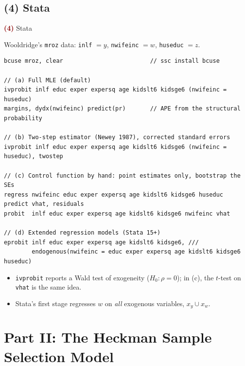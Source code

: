\documentclass[aspectratio=169,11pt]{beamer}
\newcommand{\Part}[1]{\textcolor{DarkRed}{\textbf{(#1)}}}
\begin{document}
\subsection{(4) Stata}

\begin{frame}[fragile]{\Part{4} Stata}

Wooldridge's \texttt{mroz} data: \texttt{inlf} $=y$, \texttt{nwifeinc} $=w$, \texttt{huseduc} $=z$.

\begin{lstlisting}[style=stata]
bcuse mroz, clear                         // ssc install bcuse

// (a) Full MLE (default)
ivprobit inlf educ exper expersq age kidslt6 kidsge6 (nwifeinc = huseduc)
margins, dydx(nwifeinc) predict(pr)       // APE from the structural probability

// (b) Two-step estimator (Newey 1987), corrected standard errors
ivprobit inlf educ exper expersq age kidslt6 kidsge6 (nwifeinc = huseduc), twostep

// (c) Control function by hand: point estimates only, bootstrap the SEs
regress nwifeinc educ exper expersq age kidslt6 kidsge6 huseduc
predict vhat, residuals
probit  inlf educ exper expersq age kidslt6 kidsge6 nwifeinc vhat

// (d) Extended regression models (Stata 15+)
eprobit inlf educ exper expersq age kidslt6 kidsge6, ///
        endogenous(nwifeinc = educ exper expersq age kidslt6 kidsge6 huseduc)
\end{lstlisting}

\vspace{-0.2em}
\footnotesize
\begin{itemize}
  \item \texttt{ivprobit} reports a Wald test of exogeneity ($H_0:\rho=0$);
        in (c), the $t$-test on \texttt{vhat} is the same idea.
  \item Stata's first stage regresses $w$ on \emph{all} exogenous variables, $x_y\cup x_w$.
\end{itemize}

\end{frame}

\section{Part II: The Heckman Sample Selection Model}
\end{document}
